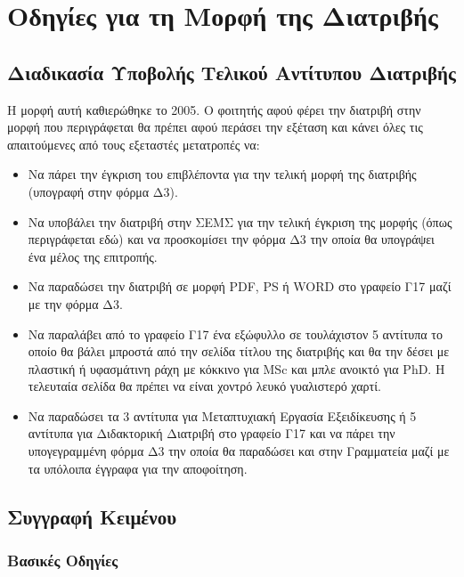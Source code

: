 \chapter{Οδηγίες για τη Μορφή της Διατριβής}
\label{ch:Instructions}


\section{Διαδικασία Υποβολής Τελικού Αντίτυπου Διατριβής}
\label{sec:Submission}

{\color{red}
Η μορφή αυτή καθιερώθηκε το 2005. Ο φοιτητής αφού φέρει την
διατριβή στην μορφή που περιγράφεται θα πρέπει αφού περάσει την
εξέταση και κάνει όλες τις απαιτούμενες από τους εξεταστές
μετατροπές να:

\begin{itemize}
\item Να πάρει την έγκριση του επιβλέποντα για την τελική μορφή της διατριβής (υπογραφή στην φόρμα Δ3).
\item Να υποβάλει την διατριβή στην ΣΕΜΣ για την τελική έγκριση της μορφής (όπως περιγράφεται εδώ) και να προσκομίσει την φόρμα Δ3 την οποία θα υπογράψει ένα μέλος της επιτροπής.
\item Να παραδώσει την διατριβή σε μορφή PDF, PS ή WORD στο γραφείο Γ17 μαζί με την φόρμα Δ3.
\item Να παραλάβει από το γραφείο Γ17 ένα εξώφυλλο σε τουλάχιστον 5 αντίτυπα το οποίο θα βάλει μπροστά από την σελίδα τίτλου της διατριβής και θα την δέσει με πλαστική ή υφασμάτινη ράχη με κόκκινο για MSc και μπλε ανοικτό για PhD. H τελευταία σελίδα θα πρέπει να είναι χοντρό λευκό γυαλιστερό χαρτί.
\item Να παραδώσει τα 3 αντίτυπα για Μεταπτυχιακή Εργασία Εξειδίκευσης ή 5 αντίτυπα για Διδακτορική Διατριβή στο γραφείο Γ17 και να πάρει την υπογεγραμμένη φόρμα Δ3 την οποία θα παραδώσει και στην Γραμματεία μαζί με τα υπόλοιπα έγγραφα για την αποφοίτηση.
\end{itemize}}


\section{Συγγραφή Κειμένου}
\label{sec:Text}

\subsection{Βασικές Οδηγίες}
\label{subsec:Basic}

